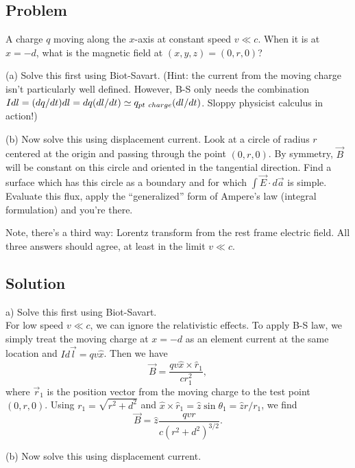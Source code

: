 \documentclass[solutions]{esg8022pset}
\begin{document}
\subsection{Problem}
A charge $q$ moving
along the $x$-axis at constant speed $v \ll c$.  When it is at $x =
-d$, what is the magnetic field at $(x,y,z) = (0,r,0)$?

\par\noindent (a)  Solve this first using Biot-Savart.  (Hint:
the current from the moving charge isn't particularly well defined.
However, B-S only needs the combination $I dl = (dq/dt) dl = dq
(dl/dt) \simeq q_{\rm pt\ charge}(dl/dt)$.  Sloppy physicist calculus
in action!)

\par\noindent (b)  Now solve this using displacement current.
Look at a circle of radius $r$ centered at the origin and passing
through the point $(0,r,0)$.  By symmetry, $\vec B$ will be constant
on this circle and oriented in the tangential direction.  Find a
surface which has this circle as a boundary and for which $\int \vec
E\cdot d\vec a$ is simple.  Evaluate this flux, apply the
``generalized'' form of Ampere's law (integral formulation) and you're
there.

\par\noindent Note, there's a third way: Lorentz transform from the
rest frame electric field.  All
three answers should agree, at least in the limit $v \ll c$.

\subsection{Solution}
a) Solve this first using Biot-Savart.\\

For low speed $v\ll c$, we can ignore the relativistic effects.  To
apply B-S law, we simply treat the moving charge at $x=-d$ as an
element current at the same location and $I d\vec{l}=qv\hat{x}$.  Then
we have
\begin{equation}
\vec{B}= \frac{qv\hat{x}\times\hat{r}_1}{cr_1^2},
\end{equation}
where $\vec{r}_1$ is the position vector from the moving charge to the
test point $(0,r,0)$.  Using $r_1 = \sqrt{r^2 + d^2}$ and $\hat
x\times\hat r_1 = \hat z\sin\theta_1 = \hat z r/r_1$, we find
\begin{equation}
\vec{B}= \hat{z}\frac{qvr}{c(r^2+d^2)^{3/2}}.
\end{equation}

(b) Now solve this using displacement current.\\
\end{document}
